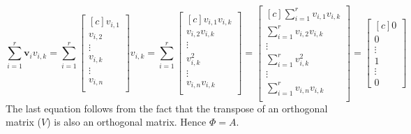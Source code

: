 \documentclass{tufte-handout}
\begin{document}
\[
\sum_{i=1}^{r} \mathbf{v}_i v_{i,k}
=
\sum_{i=1}^{r} \begin{bmatrix*}[c]
v_{i,1}\\v_{i,2}\\ \vdots\\v_{i,k}\\ \vdots \\v_{i,n}\\
\end{bmatrix*} v_{i,k}
=
\sum_{i=1}^{r} \begin{bmatrix*}[c]
v_{i,1}v_{i,k}\\v_{i,2}v_{i,k}\\ \vdots\\v_{i,k}^2\\ \vdots \\v_{i,n}v_{i,k}\\
\end{bmatrix*}
=
\begin{bmatrix*}[c]
\sum_{i=1}^{r}v_{i,1}v_{i,k}\\\sum_{i=1}^{r}v_{i,2}v_{i,k}\\ \vdots\\\sum_{i=1}^{r}v_{i,k}^2\\ \vdots \\\sum_{i=1}^{r}v_{i,n}v_{i,k}\\
\end{bmatrix*}
=
\begin{bmatrix*}[c]
0\\0\\ \vdots\\1\\ \vdots \\0
\end{bmatrix*}
\]
The last equation follows from the fact that the transpose of an orthogonal matrix ($V$) is also an orthogonal matrix. Hence $\Phi=A$.\\\leavevmode
\end{document}
